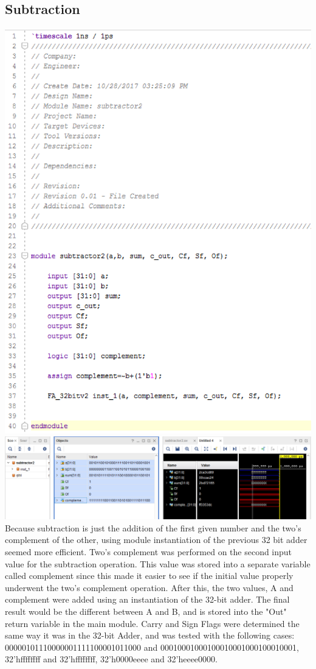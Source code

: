 \documentclass{article}
\begin{document}
\subsection{Subtraction}
\includegraphics[scale=0.5]{photos/subtractor_code}
\break
\includegraphics[scale=0.41]{photos/subtractor_simulation}
\break
Because subtraction is just the addition of the first given number and the two's complement of the other, using module instantiation of the previous 32 bit adder seemed more efficient. Two's complement was performed on the second input value for the subtraction operation. This value was stored into a separate variable called complement since this made it easier to see if the initial value properly underwent the two's complement operation. After this, the two values, A and complement were added using an instantiation of the 32-bit adder. The final result would be the different between A and B, and is stored into the "Out" return variable in the main module. Carry and Sign Flags were determined the same way it was in the 32-bit Adder, and was tested with the following cases:
00000101110000001111100001011000 and 00010001000100010001000100010001, 32'hffffffff and 32'hffffffff, 32'h0000eeee and 32'heeee0000.
\end{document}
